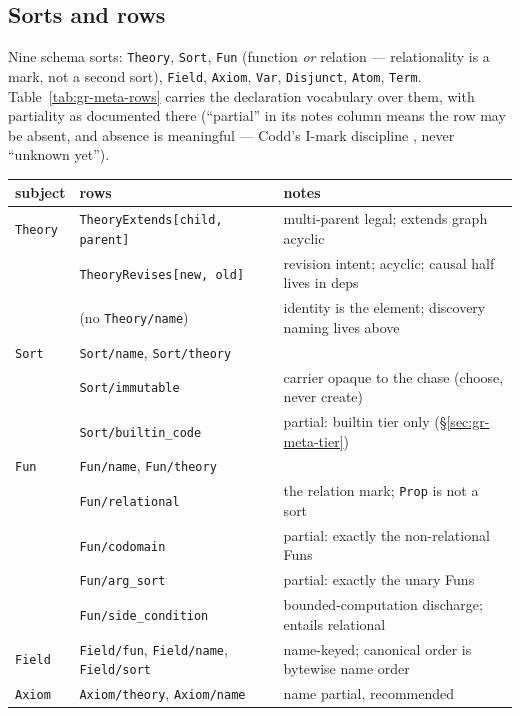 \subsection{Sorts and rows}
\label{sec:gr-meta-rows}

Nine schema sorts: \texttt{Theory}, \texttt{Sort}, \texttt{Fun}
(function \emph{or} relation — relationality is a mark, not a second
sort), \texttt{Field}, \texttt{Axiom}, \texttt{Var},
\texttt{Disjunct}, \texttt{Atom}, \texttt{Term}.
Table~\ref{tab:gr-meta-rows} carries the declaration vocabulary over
them, with partiality as documented there (``partial'' in its notes
column means the row may be absent, and absence is meaningful —
Codd's I-mark discipline \cite{codd86}, never ``unknown yet'').

\begin{table}[htbp]
\centering\footnotesize
\begin{tabular}{@{}ll>{\raggedright\arraybackslash}p{}@{}}
\toprule
subject & rows & notes \\
\midrule
\texttt{Theory} & \texttt{TheoryExtends[child, parent]} & multi-parent legal; extends graph acyclic \\
 & \texttt{TheoryRevises[new, old]} & revision intent; acyclic; causal half lives in deps \\
 & (no \texttt{Theory/name}) & identity is the element; discovery naming lives above \\
\texttt{Sort} & \texttt{Sort/name}, \texttt{Sort/theory} & \\
 & \texttt{Sort/immutable} & carrier opaque to the chase (choose, never create) \\
 & \texttt{Sort/builtin\_code} & partial: builtin tier only (\S\ref{sec:gr-meta-tier}) \\
\texttt{Fun} & \texttt{Fun/name}, \texttt{Fun/theory} & \\
 & \texttt{Fun/relational} & the relation mark; \texttt{Prop} is not a sort \\
 & \texttt{Fun/codomain} & partial: exactly the non-relational Funs \\
 & \texttt{Fun/arg\_sort} & partial: exactly the unary Funs \\
 & \texttt{Fun/side\_condition} & bounded-computation discharge; entails relational \\
\texttt{Field} & \texttt{Field/fun}, \texttt{Field/name}, \texttt{Field/sort} & name-keyed; canonical order is bytewise name order \\
\texttt{Axiom} & \texttt{Axiom/theory}, \texttt{Axiom/name} & name partial, recommended \\

\end{tabular}
\end{table}

